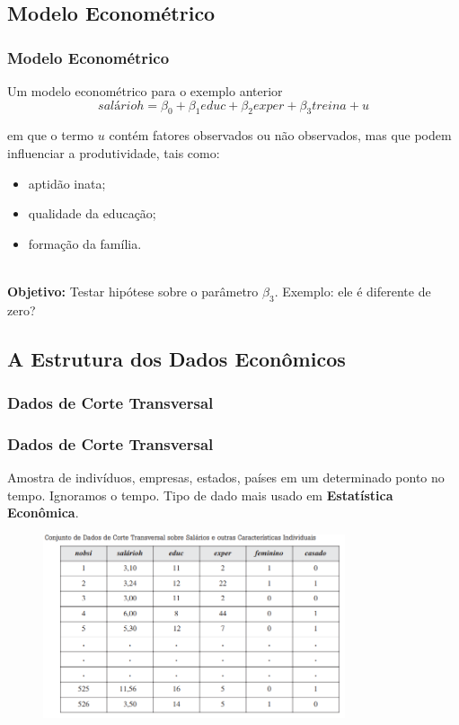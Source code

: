 \documentclass[10pt,xcolor=table]{beamer}
\begin{document}
\subsection{Modelo Econométrico}
\begin{frame}\frametitle{Modelo Econométrico} 
Um modelo econométrico para o exemplo anterior
\begin{equation}
salárioh ={\beta}_{0}+{\beta}_{1}educ+{\beta}_{2}exper+{\beta}_{3}treina+u
\end{equation}

em que o termo $u$ contém fatores observados ou não observados, mas que podem influenciar a produtividade, tais como:
  \begin{itemize}
    \item aptidão inata;
    \item qualidade da educação;
    \item formação da família.\\~\\
  \end{itemize}
\textbf{Objetivo:} Testar hipótese sobre o parâmetro ${\beta}_{3}$. Exemplo: ele é diferente de zero?
\end{frame}

\subsection{A Estrutura dos Dados Econômicos}
\subsubsection{Dados de Corte Transversal}

\begin{frame}\frametitle{Dados de Corte Transversal} 

Amostra de indivíduos, empresas, estados, países em um determinado ponto no tempo. Ignoramos o tempo. Tipo de dado mais usado em \textbf{Estatística Econômica}.

  \begin{figure}[hb]
    \includegraphics[width=3.5in]{Figure/cortetransversal.png}
  \end{figure}
\end{frame}
\end{document}
